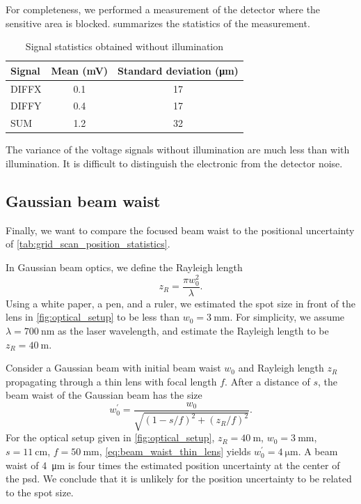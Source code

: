 For completeness, we performed a measurement of the detector where the sensitive area is blocked.
 summarizes the statistics of the measurement.
\begin{table}[htb]
  \centering
  \begin{tabular}{lcc}
    \toprule
      Signal &
      Mean (\si{\milli\volt}) &
      Standard deviation (\si{\micro\meter}) \\
    \midrule
      DIFFX & \num{0.1} & \num{17} \\
      DIFFY & \num{0.4} & \num{17} \\
      SUM & \num{1.2} & \num{32} \\
    \bottomrule
  \end{tabular}
  \captionsetup{width=.8\textwidth}
  \caption{Signal statistics obtained without illumination}\label{tab:dark_statistics}
\end{table}
The variance of the voltage signals without illumination are much less than with illumination.
It is difficult to distinguish the electronic from the detector noise.

\subsection{Gaussian beam waist}

Finally, we want to compare the focused beam waist to the positional uncertainty of \cref{tab:grid_scan_position_statistics}.

In Gaussian beam optics, we define the Rayleigh length
\begin{equation}
	z_R=\frac{\pi w_0^2}{\lambda}
	\label{eq:rayleigh_length}.
\end{equation}
Using a white paper, a pen, and a ruler, we estimated the spot size in front of the lens in \cref{fig:optical_setup} to be less than $w_0=\SI{3}{\milli\meter}$.
For simplicity, we assume $\lambda=\SI{700}{\nano\meter}$ as the laser wavelength, and estimate the Rayleigh length to be $z_R=\SI{40}{\meter}$.

Consider a Gaussian beam with initial beam waist $w_0$ and Rayleigh length $z_R$ propagating through a thin lens with focal length $f$.
After a distance of $s$, the beam waist of the Gaussian beam has the size
\begin{equation}
	w^\prime_0=\frac{w_0}{\sqrt{(1-s/f)^2+(z_R/f)^2}}
	\label{eq:beam_waist_thin_lens}.
\end{equation}
For the optical setup given in \cref{fig:optical_setup}, $z_R=\SI{40}{\meter}$, $w_0=\SI{3}{\milli\meter}$, $s=\SI{11}{\centi\meter}$, $f=\SI{50}{\milli\meter}$, \cref{eq:beam_waist_thin_lens} yields $w^\prime_0=\SI{4}{\micro\meter}$.
A beam waist of \SI{4}{\micro\meter} is four times the estimated position uncertainty at the center of the \gls{psd}.
We conclude that it is unlikely for the position uncertainty to be related to the spot size.
